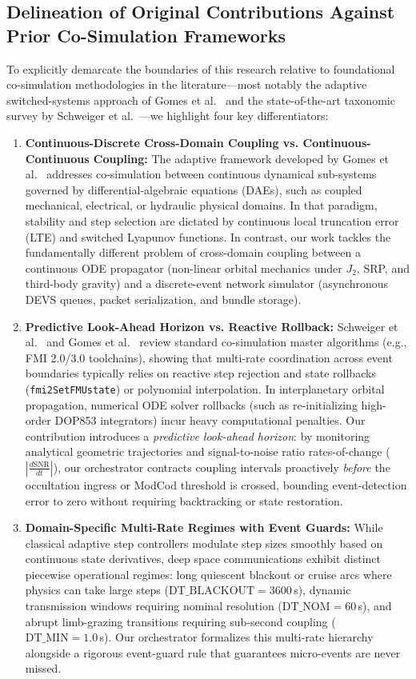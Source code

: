\documentclass[a4paper,fleqn]{cas-sc}
\begin{document}
{\color{revcolor}\subsection{Delineation of Original Contributions Against Prior Co-Simulation Frameworks}
To explicitly demarcate the boundaries of this research relative to foundational co-simulation methodologies in the literature---most notably the adaptive switched-systems approach of Gomes et al.~\cite{simpat_adaptive} and the state-of-the-art taxonomic survey by Schweiger et al.~\cite{simpat_multirate}---we highlight four key differentiators:
\begin{enumerate}
    \item \textbf{Continuous-Discrete Cross-Domain Coupling vs. Continuous-Continuous Coupling:} The adaptive framework developed by Gomes et al.~\cite{simpat_adaptive} addresses co-simulation between continuous dynamical sub-systems governed by differential-algebraic equations (DAEs), such as coupled mechanical, electrical, or hydraulic physical domains. In that paradigm, stability and step selection are dictated by continuous local truncation error (LTE) and switched Lyapunov functions. In contrast, our work tackles the fundamentally different problem of cross-domain coupling between a continuous ODE propagator (non-linear orbital mechanics under $J_2$, SRP, and third-body gravity) and a discrete-event network simulator (asynchronous DEVS queues, packet serialization, and bundle storage). 
    \item \textbf{Predictive Look-Ahead Horizon vs. Reactive Rollback:} Schweiger et al.~\cite{simpat_multirate} and Gomes et al.~\cite{gomes_cosim_survey_2018} review standard co-simulation master algorithms (e.g., FMI 2.0/3.0 toolchains), showing that multi-rate coordination across event boundaries typically relies on reactive step rejection and state rollbacks (\texttt{fmi2SetFMUstate}) or polynomial interpolation. In interplanetary orbital propagation, numerical ODE solver rollbacks (such as re-initializing high-order DOP853 integrators) incur heavy computational penalties. Our contribution introduces a \textit{predictive look-ahead horizon}: by monitoring analytical geometric trajectories and signal-to-noise ratio rates-of-change ($\left|\frac{d\text{SNR}}{dt}\right|$), our orchestrator contracts coupling intervals proactively \textit{before} the occultation ingress or ModCod threshold is crossed, bounding event-detection error to zero without requiring backtracking or state restoration.
    \item \textbf{Domain-Specific Multi-Rate Regimes with Event Guards:} While classical adaptive step controllers modulate step sizes smoothly based on continuous state derivatives, deep space communications exhibit distinct piecewise operational regimes: long quiescent blackout or cruise arcs where physics can take large steps ($\text{DT\_BLACKOUT} = 3600\,$s), dynamic transmission windows requiring nominal resolution ($\text{DT\_NOM} = 60\,$s), and abrupt limb-grazing transitions requiring sub-second coupling ($\text{DT\_MIN} = 1.0\,$s). Our orchestrator formalizes this multi-rate hierarchy alongside a rigorous event-guard rule that guarantees micro-events are never missed.

\end{enumerate}}
\end{document}
